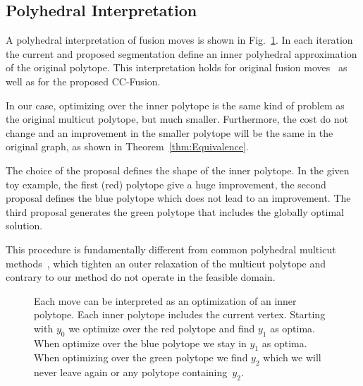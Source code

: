 \documentclass[10pt,twocolumn,letterpaper]{article}
\newtheorem{theorem}{Theorem}
\theoremstyle{definition}
\begin{document}

%






\subsection{Polyhedral Interpretation}
A polyhedral interpretation of fusion moves is shown in Fig.~\ref{fig:polyheadral}.
In each iteration the current and proposed segmentation define an inner polyhedral 
approximation of the original polytope. This interpretation holds for original 
fusion moves~\cite{Lempitsky-2010} as well as for the proposed CC-Fusion.

In our case, optimizing over the inner polytope is the same kind of problem as the original multicut polytope, but much smaller.
Furthermore, the cost do not change and an improvement in the smaller polytope will 
be the same in the original graph, as shown in Theorem~\ref{thm:Equivalence}.

The choice of the proposal defines the shape of the inner polytope. 
In the given toy example, the first (red) polytope give a huge improvement, the second proposal
defines the blue polytope which does not lead to an improvement. 
The third proposal generates the green polytope that includes the globally optimal solution.

This procedure is fundamentally different from common polyhedral multicut methods~\cite{kappes_2011_emmcvpr,kappes_2013_arxiv}, 
which tighten an outer relaxation of the multicut polytope and contrary to our method do not operate in the feasible domain. 



\begin{figure}
\centering

\caption{Each move can be interpreted as an optimization of an inner polytope.
Each inner polytope includes the current vertex. Starting with $y_0$ we optimize over the red polytope 
and find $y_1$ as optima. When optimize over the blue polytope we stay in $y_1$ as optima.
When optimizing over the green polytope we find $y_2$ which we will never leave again or any polytope containing~$y_2$. 
}
\label{fig:polyheadral}
\end{figure}





\end{document}
